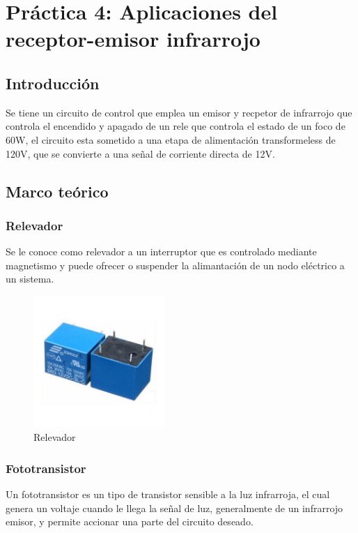\clearpage

\section{Práctica 4: Aplicaciones del receptor-emisor infrarrojo}

\subsection{Introducción}

Se tiene un circuito de control que emplea un emisor y recpetor de infrarrojo que controla el encendido y apagado de un rele que controla el estado de un foco de 60W,
el circuito esta sometido a una etapa de alimentación transformeless de 120V, que se convierte a una señal de corriente directa de 12V.

\subsection{Marco teórico}

 \subsubsection{Relevador}

 Se le conoce como relevador a un interruptor que es controlado mediante magnetismo y puede ofrecer o suspender la alimantación de un nodo eléctrico a un sistema.

 \begin{figure}[htb]
     \centering
     \includegraphics[width=5cm]{media/Rele-12V.jpg}
     \caption{Relevador}
 \end{figure}

\subsubsection{Fototransistor}

Un fototransistor es un tipo de transistor sensible a la luz infrarroja, el cual genera un voltaje cuando le llega la señal de luz, generalmente de un infrarrojo emisor,
y permite accionar una parte del circuito deseado.

